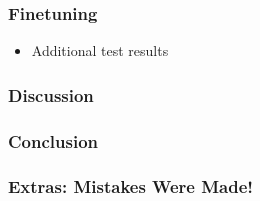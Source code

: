 \documentclass{beamer}
\begin{document}
\begin{frame}
    \frametitle{Finetuning}
    \begin{itemize}
        \item<1-> Additional test results
    \end{itemize}
\end{frame}

\begin{frame}
    \frametitle{Discussion}
\end{frame}

\begin{frame}
    \frametitle{Conclusion}
\end{frame}

\begin{frame}
    \frametitle{Extras: Mistakes Were Made!}
\end{frame}
\end{document}
